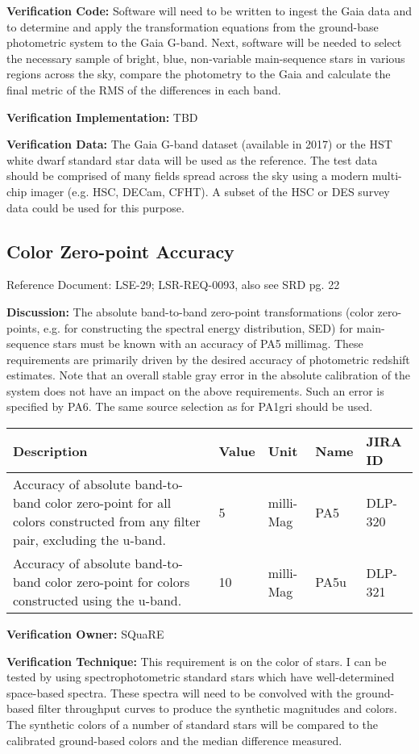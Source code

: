 \textbf{Verification Code:} Software will need to be written to ingest
the Gaia data and to determine and apply the transformation equations
from the ground-base photometric system to the Gaia G-band. Next,
software will be needed to select the necessary sample of bright, blue,
non-variable main-sequence stars in various regions across the sky,
compare the photometry to the Gaia and calculate the final metric of the
RMS of the differences in each band.

\textbf{Verification Implementation:} TBD

\textbf{Verification Data:} The Gaia G-band dataset (available in 2017)
or the HST white dwarf standard star data will be used as the reference.
The test data should be comprised of many fields spread across the sky
using a modern multi-chip imager (e.g. HSC, DECam, CFHT). A subset of
the HSC or DES survey data could be used for this purpose.

\subsection{Color Zero-point Accuracy}\label{color-zero-point-accuracy}

Reference Document: LSE-29; LSR-REQ-0093, also see SRD pg. 22

\textbf{Discussion:} The absolute band-to-band zero-point
transformations (color zero-points, e.g. for constructing the spectral
energy distribution, SED) for main-sequence stars must be known with an
accuracy of PA5 millimag. These requirements are primarily driven by the
desired accuracy of photometric redshift estimates. Note that an overall
stable gray error in the absolute calibration of the system does not
have an impact on the above requirements. Such an error is specified by
PA6. The same source selection as for PA1gri should be used.

\begin{longtable}[]{@{}lllll@{}}
\toprule
Description & Value & Unit & Name & JIRA ID\tabularnewline
\midrule
\endhead
Accuracy of absolute band-to-band color zero-point for all colors
constructed from any filter pair, excluding the u-band. & 5 & milli-Mag
& PA5 & DLP-320\tabularnewline
Accuracy of absolute band-to-band color zero-point for colors
constructed using the u-band. & 10 & milli-Mag & PA5u &
DLP-321\tabularnewline
\bottomrule
\end{longtable}

\textbf{Verification Owner:} SQuaRE

\textbf{Verification Technique:} This requirement is on the color of
stars. I can be tested by using spectrophotometric standard stars which
have well-determined space-based spectra. These spectra will need to be
convolved with the ground-based filter throughput curves to produce the
synthetic magnitudes and colors. The synthetic colors of a number of
standard stars will be compared to the calibrated ground-based colors
and the median difference measured.

